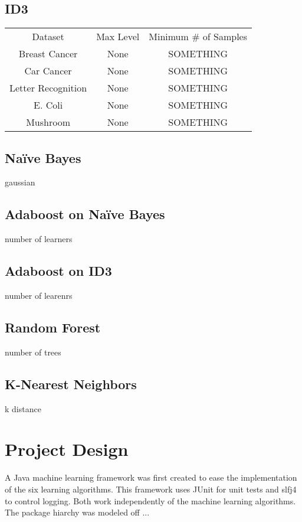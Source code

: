 \documentclass[11pt]{article}
\begin{document}
\subsection{ID3}
\begin{tabular}{ |c|c|c| }
  Dataset            & Max Level & Minimum \# of Samples \\
  Breast Cancer      & None      & SOMETHING            \\
  Car Cancer         & None      & SOMETHING            \\
  Letter Recognition & None      & SOMETHING            \\
  E. Coli            & None      & SOMETHING            \\
  Mushroom           & None      & SOMETHING
\end{tabular}

\subsection{Naïve Bayes}
gaussian

\subsection{Adaboost on Naïve Bayes}
number of learners

\subsection{Adaboost on ID3}
number of learenrs

\subsection{Random Forest}
number of trees

\subsection{K-Nearest Neighbors}
k
distance

\section{Project Design}
A Java machine learning framework was first created to ease the implementation of the six learning algorithms. This framework uses JUnit for unit tests and slfj4 to control logging. Both work independently of the machine learning algorithms. The package hiarchy was modeled off ...
\end{document}
